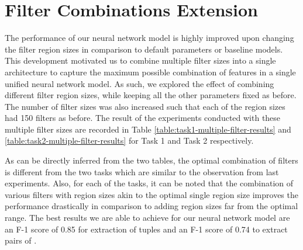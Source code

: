 \section{Filter Combinations Extension}
\label{section:filter-combinations-extension}
The performance of our neural network model is highly improved upon changing the filter region sizes in comparison to default parameters or baseline models. This development motivated us to combine multiple filter sizes into a single architecture to capture the maximum possible combination of features in a single unified neural network model. As such, we explored the effect of combining different filter region sizes, while keeping all the other parameters fixed as before. The number of filter sizes was also increased such that each of the region sizes had 150 filters as before. The result of the experiments conducted with these multiple filter sizes are recorded in Table \ref{table:task1-multiple-filter-results} and \ref{table:task2-multiple-filter-results} for Task 1 and Task 2 respectively. 

As can be directly inferred from the two tables, the optimal combination of filters is different from the two tasks which are similar to the observation from last experiments. Also, for each of the tasks, it can be noted that the combination of various filters with region sizes akin to the optimal single region size improves the performance drastically in comparison to adding region sizes far from the optimal range. The best results we are able to achieve for our neural network model are an F-1 score of 0.85 for extraction of {\it <stage, ethnicity>} tuples and an F-1 score of 0.74 to extract pairs of {\it <stage, sample size>}.

